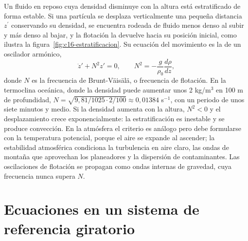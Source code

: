 \documentclass[10pt,openany]{book}
\begin{document}
\begin{minipage}{\linewidth}
%
\fi
\fi
\endgroup
\par\nopagebreak
{}
\end{minipage}
\par\vspace{\baselineskip}

Un fluido en reposo cuya densidad disminuye con la altura está estratificado de forma estable. Si una partícula se desplaza verticalmente una pequeña distancia \(z^{\prime}\) conservando su densidad, se encuentra rodeada de fluido menos denso al subir y más denso al bajar, y la flotación la devuelve hacia su posición inicial, como ilustra la figura~\ref{fig:c16-estratificacion}. Su ecuación del movimiento es la de un oscilador armónico,
\begin{equation}
\ddot z' + N^{2}z' = 0, \qquad N^{2} = -\frac{g}{\rho_0}\frac{d\rho}{dz}, \label{eq:c16-brunt}
\end{equation}
donde \(N\) es la frecuencia de Brunt-Väisälä, o frecuencia de flotación. En la termoclina oceánica, donde la densidad puede aumentar unos 2 kg/m\(^3\) en 100 m de profundidad, \(N = \sqrt{9{,}81/1025\cdot 2/100} \approx 0{,}01384\) s\(^{-1}\), con un periodo de unos siete minutos y medio. Si la densidad aumenta con la altura, \(N^{2} < 0\) y el desplazamiento crece exponencialmente: la estratificación es inestable y se produce convección. En la atmósfera el criterio es análogo pero debe formularse con la temperatura potencial, porque el aire se expande al ascender; la estabilidad atmosférica condiciona la turbulencia en aire claro, las ondas de montaña que aprovechan los planeadores y la dispersión de contaminantes. Las oscilaciones de flotación se propagan como ondas internas de gravedad, cuya frecuencia nunca supera \(N\).

\section{Ecuaciones en un sistema de referencia giratorio}
\end{document}

